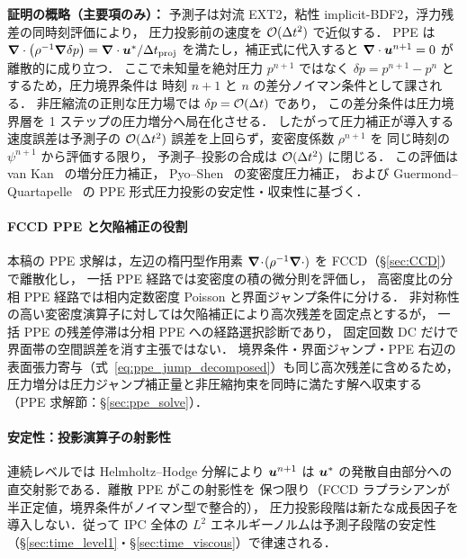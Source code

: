 \noindent\textbf{証明の概略（主要項のみ）：}
予測子は対流 EXT2，粘性 implicit-BDF2，浮力残差の同時刻評価により，
圧力投影前の速度を $\mathcal{O}(\Delta t^2)$ で近似する．
PPE は
$\bm{\nabla}\cdot\bigl(\rho^{-1}\bm{\nabla}\delta p\bigr)=\bm{\nabla}\cdot\bm{u}^*/\Delta t_{\mathrm{proj}}$
を満たし，補正式に代入すると $\bm{\nabla}\cdot\bm{u}^{n+1}=0$ が離散的に成り立つ．
ここで未知量を絶対圧力 $p^{n+1}$ ではなく
$\delta p=p^{n+1}-p^n$ とするため，圧力境界条件は
時刻 $n+1$ と $n$ の差分ノイマン条件として課される．
非圧縮流の正則な圧力場では $\delta p=\mathcal{O}(\Delta t)$ であり，
この差分条件は圧力境界層を 1 ステップの圧力増分へ局在化させる．
したがって圧力補正が導入する速度誤差は予測子の
$\mathcal{O}(\Delta t^2)$ 誤差を上回らず，変密度係数 $\rho^{n+1}$ を
同じ時刻の $\psi^{n+1}$ から評価する限り，
予測子--投影の合成は $\mathcal{O}(\Delta t^2)$ に閉じる．
この評価は van Kan~\cite{vanKan1986} の増分圧力補正，
Pyo--Shen~\cite{PyoShen2007} の変密度圧力補正，
および Guermond--Quartapelle~\cite{GuermondQuartapelle1998} の
PPE 形式圧力投影の安定性・収束性に基づく．

\paragraph{FCCD PPE と欠陥補正の役割}
本稿の PPE 求解は，左辺の楕円型作用素
$\bm{\nabla}\!\cdot\!(\rho^{-1}\bm{\nabla}\cdot)$ を FCCD（§\ref{sec:CCD}）で離散化し，
一括 PPE 経路では変密度の積の微分則を評価し，
高密度比の分相 PPE 経路では相内定数密度 Poisson と界面ジャンプ条件に分ける．
非対称性の高い変密度演算子に対しては欠陥補正により高次残差を固定点とするが，
一括 PPE の残差停滞は分相 PPE への経路選択診断であり，
固定回数 DC だけで界面帯の空間誤差を消す主張ではない．
境界条件・界面ジャンプ・PPE 右辺の
表面張力寄与（式~\eqref{eq:ppe_jump_decomposed}）も同じ高次残差に含めるため，
圧力増分は圧力ジャンプ補正量と非圧縮拘束を同時に満たす解へ収束する
（PPE 求解節：§\ref{sec:ppe_solve}）．

\paragraph{安定性：投影演算子の射影性}
連続レベルでは Helmholtz--Hodge 分解により $\bm{u}^{n+1}$ は
$\bm{u}^{*}$ の発散自由部分への直交射影である．離散 PPE がこの射影性を
保つ限り（FCCD ラプラシアンが半正定値，境界条件がノイマン型で整合的），
圧力投影段階は新たな成長因子を導入しない．従って IPC 全体の
$L^2$ エネルギーノルムは予測子段階の安定性
（§\ref{sec:time_level1}・§\ref{sec:time_viscous}）で律速される．


